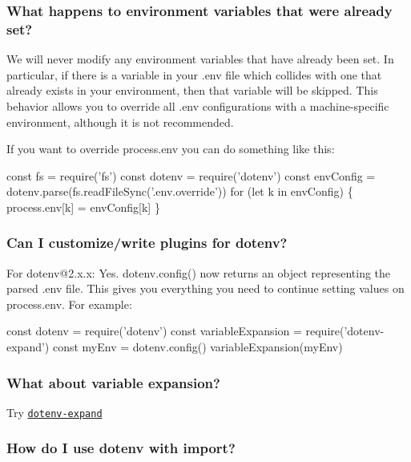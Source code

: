 \subsubsection*{What happens to environment variables that were already set?}

We will never modify any environment variables that have already been set. In particular, if there is a variable in your {\ttfamily .env} file which collides with one that already exists in your environment, then that variable will be skipped. This behavior allows you to override all {\ttfamily .env} configurations with a machine-\/specific environment, although it is not recommended.

If you want to override {\ttfamily process.\+env} you can do something like this\+:


\begin{DoxyCode}
const fs = require('fs')
const dotenv = require('dotenv')
const envConfig = dotenv.parse(fs.readFileSync('.env.override'))
for (let k in envConfig) \{
  process.env[k] = envConfig[k]
\}
\end{DoxyCode}


\subsubsection*{Can I customize/write plugins for dotenv?}

For {\ttfamily dotenv@2.\+x.\+x}\+: Yes. {\ttfamily dotenv.\+config()} now returns an object representing the parsed {\ttfamily .env} file. This gives you everything you need to continue setting values on {\ttfamily process.\+env}. For example\+:


\begin{DoxyCode}
const dotenv = require('dotenv')
const variableExpansion = require('dotenv-expand')
const myEnv = dotenv.config()
variableExpansion(myEnv)
\end{DoxyCode}


\subsubsection*{What about variable expansion?}

Try \href{https://github.com/motdotla/dotenv-expand}{\tt dotenv-\/expand}

\subsubsection*{How do I use dotenv with {\ttfamily import}?}

